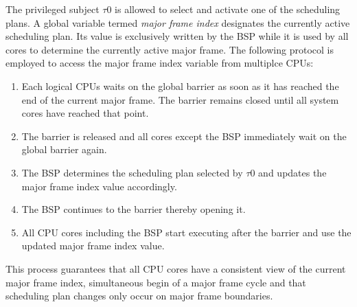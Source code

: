 The privileged subject $\tau$0 is allowed to select and activate one of the
scheduling plans. A global variable termed \emph{major frame index} designates
the currently active scheduling plan. Its value is exclusively written by the
BSP while it is used by all cores to determine the currently active major frame.
The following protocol is employed to access the major frame index variable from
multiplce CPUs:

\begin{enumerate}
	\item Each logical CPUs waits on the global barrier as soon as it has
		reached the end of the current major frame. The barrier remains closed
		until all system cores have reached that point.
	\item The barrier is released and all cores except the BSP immediately wait
		on the global barrier again.
	\item The BSP determines the scheduling plan selected by $\tau$0 and updates
		the major frame index value accordingly.
	\item The BSP continues to the barrier thereby opening it.
	\item All CPU cores including the BSP start executing after the barrier and
		use the updated major frame index value.
\end{enumerate}

This process guarantees that all CPU cores have a consistent view of the current
major frame index, simultaneous begin of a major frame cycle and that scheduling
plan changes only occur on major frame boundaries.
